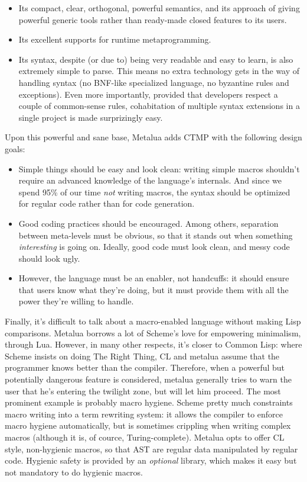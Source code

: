 \begin{itemize}
\item Its compact, clear, orthogonal, powerful semantics, and its
  approach of giving powerful generic tools rather than ready-made
  closed features to its users.
\item Its excellent supports for runtime metaprogramming.
\item Its syntax, despite (or due to) being very readable and easy
  to learn, is also extremely simple to parse. This means no extra
  technology gets in the way of handling syntax (no BNF-like
  specialized language, no byzantine rules and exceptions). Even more
  importantly, provided that developers respect a couple of
  common-sense rules, cohabitation of multiple syntax extensions in a
  single project is made surprizingly easy.
\end{itemize}

Upon this powerful and sane base, Metalua adds CTMP with the following
design goals:

\begin{itemize}
\item Simple things should be easy and look clean: writing simple
  macros shouldn't require an advanced knowledge of the language's
  internals. And since we spend 95\% of our time {\em not} writing
  macros, the syntax should be optimized for regular code rather than
  for code generation.
\item Good coding practices should be encouraged. Among others,
  separation between meta-levels must be obvious, so that it stands
  out when something {\em interesting} is going on. Ideally, good code
  must look clean, and messy code should look ugly.
\item However, the language must be an enabler, not handcuffs: it
  should ensure that users know what they're doing, but it must
  provide them with all the power they're willing to handle.
\end{itemize}

Finally, it's difficult to talk about a macro-enabled language without making
Lisp comparisons. Metalua borrows a lot of Scheme's love for empowering
minimalism, through Lua. However, in many other respects, it's closer to Common
Lisp: where Scheme insists on doing The Right Thing, CL and metalua assume that
the programmer knows better than the compiler. Therefore, when a powerful but
potentially dangerous feature is considered, metalua generally tries to warn the
user that he's entering the twilight zone, but will let him proceed. The most
prominent example is probably macro hygiene. Scheme pretty much constraints
macro writing into a term rewriting system: it allows the compiler to enforce
macro hygiene automatically, but is sometimes crippling when writing complex
macros (although it is, of cource, Turing-complete). Metalua opts to offer CL
style, non-hygienic macros, so that AST are regular data manipulated by regular
code. Hygienic safety is provided by an {\em optional} library, which makes it
easy but not mandatory to do hygienic macros.

